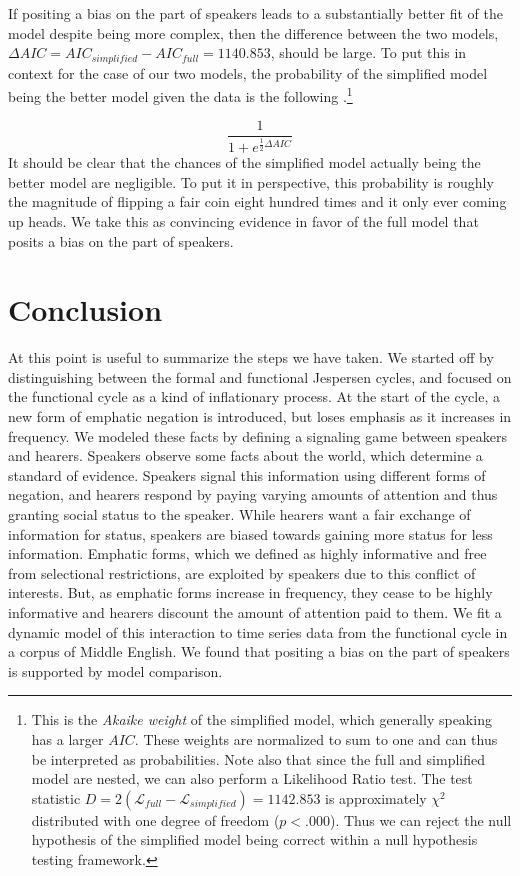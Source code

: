 \documentclass[linguex]{sp}
\theoremstyle{definition} \newtheorem{definition}{Definition}
\begin{document}
If positing a bias on the part of speakers leads to a substantially better fit of the model despite being more complex, then the difference between the two models,  $\Delta AIC = AIC_{simplified} - AIC_{full} = 1140.853$, should be large. To put this in context for the case of our two models, the probability of the simplified model being the better model given the data is the following \citep[74-79]{burnham2003}.\footnote{This is the \emph{Akaike weight} of the simplified model, which generally speaking has a larger $AIC$. These weights are normalized to sum to one and can thus be interpreted as probabilities. Note also that since the full and simplified model are nested, we can also perform a Likelihood Ratio test. The test statistic $D = 2(\mathcal{L}_{full} - \mathcal{L}_{simplified}) = 1142.853$ is approximately $\chi^2$ distributed with one degree of freedom ($p < .000$). Thus we can reject the null hypothesis of the simplified model being correct within a null hypothesis testing framework.}

\begin{equation}
	\frac{1}{1 + e^{\frac{1}{2}\Delta AIC}}
\end{equation}
It should be clear that the chances of the simplified model actually being the better model are negligible. To put it in perspective, this probability is roughly the magnitude of flipping a fair coin eight hundred times and it only ever coming up heads. We take this as convincing evidence in favor of the full model that posits a bias on the part of speakers.

\section{Conclusion}
\label{Conclusion}

At this point is useful to summarize the steps we have taken. We started off by distinguishing between the formal and functional Jespersen cycles, and focused on the functional cycle as a kind of inflationary process. At the start of the cycle, a new form of emphatic negation is introduced, but loses emphasis as it increases in frequency. We modeled these facts by defining a signaling game between speakers and hearers. Speakers observe some facts about the world, which determine a standard of evidence. Speakers signal this information using different forms of negation, and hearers respond by paying varying amounts of attention and thus granting social status to the speaker. While hearers want a fair exchange of information for status, speakers are biased towards gaining more status for less information. Emphatic forms, which we defined as highly informative and free from selectional restrictions, are exploited by speakers due to this conflict of interests. But, as emphatic forms increase in frequency, they cease to be highly informative and hearers discount the amount of attention paid to them. We fit a dynamic model of this interaction to time series data from the functional cycle in a corpus of Middle English. We found that positing a bias on the part of speakers is supported by model comparison.
\end{document}
